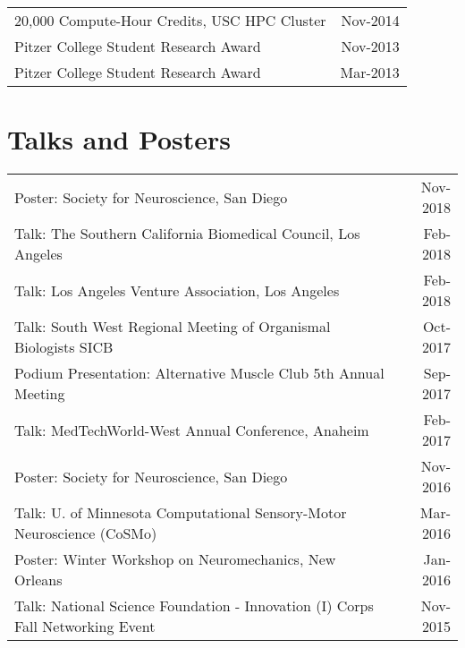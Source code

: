 \documentclass[10pt,a4paper]{article}
\begin{document}
\begin{tabularx}{17cm}{X r}
    20,000 Compute-Hour Credits, USC HPC Cluster & Nov-2014 \\
    Pitzer College Student Research Award & Nov-2013 \\
    Pitzer College Student Research Award & Mar-2013 \\
  \end{tabularx}

  \vspace*{2mm}\section*{Talks and Posters}

  \vspace*{1mm}\noindent\begin{tabularx}{17cm}{X r}
        Poster: Society for Neuroscience, San Diego & Nov-2018 \\ %
  	Talk: The Southern California Biomedical Council, Los Angeles & Feb-2018 \\ %
  	Talk: Los Angeles Venture Association, Los Angeles & Feb-2018 \\%
	Talk: South West Regional Meeting of Organismal Biologists SICB & Oct-2017 \\
    Podium Presentation: Alternative Muscle Club 5th Annual Meeting & Sep-2017 \\
    Talk: MedTechWorld-West Annual Conference, Anaheim & Feb-2017\\
    Poster: Society for Neuroscience, San Diego & Nov-2016 \\ 
    Talk: U. of Minnesota Computational Sensory-Motor Neuroscience (CoSMo)& Mar-2016 \\
    Poster: Winter Workshop on Neuromechanics, New Orleans & Jan-2016 \\ %
      Talk: National Science Foundation - Innovation (I) Corps Fall Networking Event & Nov-2015\\

\end{tabularx}
\end{document}
